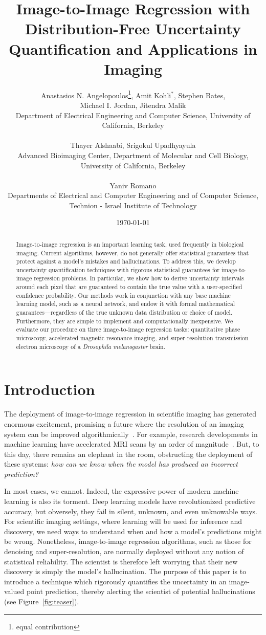 \documentclass[10pt]{article}
\title{Image-to-Image Regression with Distribution-Free Uncertainty Quantification and Applications in Imaging}
\author{Anastasios N. Angelopoulos\footnote{equal contribution}, Amit Kohli$^*$, Stephen Bates,\\
Michael I. Jordan, Jitendra Malik\\ 
\small{
Department of Electrical Engineering and Computer Science, University of California, Berkeley} \\
\\

Thayer Alshaabi, Srigokul Upadhyayula \\
\small{
Advanced Bioimaging Center, Department of Molecular and Cell Biology, University of California, Berkeley} \\
\\
Yaniv Romano \\
\small{
Departments of Electrical and Computer Engineering and of Computer Science, Technion - Israel Institute of Technology}}
\date{\today}
\begin{document}
\maketitle

\begin{abstract}
    Image-to-image regression is an important learning task, used frequently in biological imaging.
    Current algorithms, however, do not generally offer statistical guarantees that protect against a model's mistakes and hallucinations.
    To address this, we develop uncertainty quantification techniques with rigorous statistical guarantees for image-to-image regression problems.
    In particular, we show how to derive uncertainty intervals around each pixel that are guaranteed to contain the true value with a user-specified confidence probability.
    Our methods work in conjunction with any base machine learning model, such as a neural network, and endow it with formal mathematical guarantees—regardless of the true unknown data distribution or choice of model.
    Furthermore, they are simple to implement and computationally inexpensive.
    We evaluate our procedure on three image-to-image regression tasks: quantitative phase microscopy, accelerated magnetic resonance imaging, and super-resolution transmission electron microscopy of a \emph{Drosophila melanogaster} brain. 
\end{abstract}

\section{Introduction}
\label{sec:introduction}
The deployment of image-to-image regression in scientific imaging has generated enormous excitement, promising a future where the resolution of an imaging system can be improved algorithmically~\cite{weigert2018content}.
For example, research developments in machine learning have accelerated MRI scans by an order of magnitude~\cite{zbontar2018fastmri}.
But, to this day, there remains an elephant in the room, obstructing the deployment of these systems: \emph{how can we know when the model has produced an incorrect prediction?}

In most cases, we cannot. 
Indeed, the expressive power of modern machine learning is also its torment.
Deep learning models have revolutionized predictive accuracy, but obversely, they fail in silent, unknown, and even unknowable ways.
For scientific imaging settings, where learning will be used for inference and discovery, we need ways to understand when and how a model's predictions might be wrong.
Nonetheless, image-to-image regression algorithms, such as those for denoising and super-resolution, are normally deployed without any notion of statistical reliability.
The scientist is therefore left worrying that their new discovery is simply the model's hallucination.
The purpose of this paper is to introduce a technique which rigorously quantifies the uncertainty in an image-valued point prediction, thereby alerting the scientist of potential hallucinations (see Figure~\ref{fig:teaser}).
\end{document}
